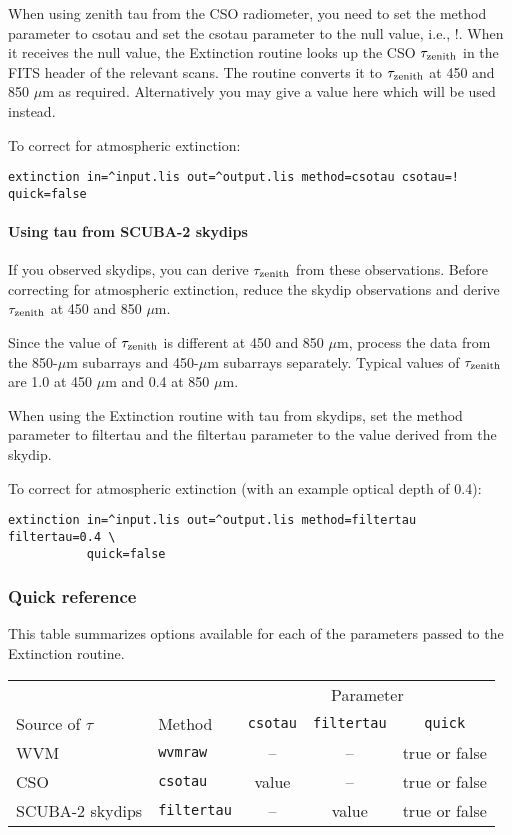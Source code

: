 \documentclass[twoside,11pt]{article}
\renewcommand{\_}{\texttt{\symbol{95}}}
\begin{document}
When using zenith tau from the CSO radiometer, you need to set the
method parameter to csotau and set the csotau parameter to the null
value, i.e., !. When it receives the null value, the Extinction
routine looks up the CSO $\tau_{\rm zenith}$ in the FITS header of the
relevant scans. The routine converts it to $\tau_{\rm zenith}$ at 450
and 850 $\mu$m as required. Alternatively you may give a value here
which will be used instead.

To correct for atmospheric extinction:
\begin{verbatim}
extinction in=^input.lis out=^output.lis method=csotau csotau=! quick=false
\end{verbatim}


\paragraph{Using tau from SCUBA-2 skydips}

If you observed skydips, you can derive $\tau_{\rm zenith}$ from these
observations. Before correcting for atmospheric extinction, reduce the
skydip observations and derive $\tau_{\rm zenith}$ at 450 and 850 $\mu$m.

Since the value of $\tau_{\rm zenith}$ is different at 450 and 850
$\mu$m, process the data from the 850-$\mu$m subarrays and 450-$\mu$m
subarrays separately. Typical values of $\tau_{\rm zenith}$ are 1.0 at
450 $\mu$m and 0.4 at 850 $\mu$m.

When using the Extinction routine with tau from skydips, set the
method parameter to filtertau and the filtertau parameter to the value
derived from the skydip.

To correct for atmospheric extinction (with an example optical depth
of 0.4):
\begin{verbatim}
extinction in=^input.lis out=^output.lis method=filtertau filtertau=0.4 \
           quick=false
\end{verbatim}

\subsubsection{Quick reference}

This table summarizes options available for each of the parameters
passed to the Extinction routine.

\begin{table}
\begin{tabular}{llccc}
\hline
                 &           & \multicolumn{3}{c}{Parameter} \\
Source of $\tau$ & Method    & \verb+csotau+ & \verb+filtertau+ & \verb+quick+ \\
\hline                                               
WVM              & \verb+wvmraw+    &  --     &   --       & true or false \\
CSO              & \verb+csotau+    & value   &   --       & true or false \\
SCUBA-2 skydips  & \verb+filtertau+ &  --     & value      & true or false \\
\hline
\end{tabular}
\end{table}
\end{document}
